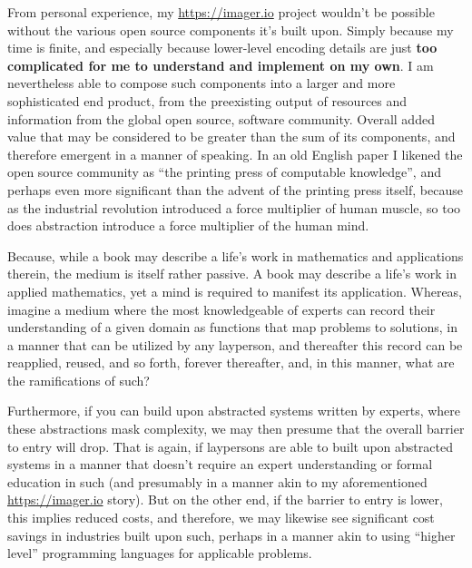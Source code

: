 From personal experience, my \url{https://imager.io} project wouldn’t be possible without the various open source components it’s built upon. Simply because my time is finite, and especially because lower-level encoding details are just \textbf{too complicated for me to understand and implement on my own}. I am nevertheless able to compose such components into a larger and more sophisticated end product, from the preexisting output of resources and information from the global open source, software community. Overall added value that may be considered to be greater than the sum of its components, and therefore emergent in a manner of speaking. In an old English paper I likened the open source community as ``the printing press of computable knowledge'', and perhaps even more significant than the advent of the printing press itself, because as the industrial revolution introduced a force multiplier of human muscle, so too does abstraction introduce a force multiplier of the human mind.

Because, while a book may describe a life’s work in mathematics and applications therein, the medium is itself rather passive. A book may describe a life’s work in applied mathematics, yet a mind is required to manifest its application. Whereas, imagine a medium where the most knowledgeable of experts can record their understanding of a given domain as functions that map problems to solutions, in a manner that can be utilized by any layperson, and thereafter this record can be reapplied, reused, and so forth, forever thereafter, and, in this manner, what are the ramifications of such?

Furthermore, if you can build upon abstracted systems written by experts, where these abstractions mask complexity, we may then presume that the overall barrier to entry will drop. That is again, if laypersons are able to built upon abstracted systems in a manner that doesn't require an expert understanding or formal education in such (and presumably in a manner akin to my aforementioned \url{https://imager.io} story). But on the other end, if the barrier to entry is lower, this implies reduced costs, and therefore, we may likewise see significant cost savings in industries built upon such, perhaps in a manner akin to using ``higher level'' programming languages for applicable problems. 